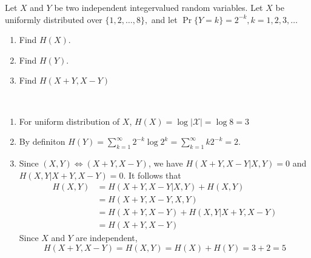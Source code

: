 \begin{exercise}{Let $X$ and $Y$ be two independent integervalued random variables. Let $X$ be uniformly distributed over $\{1,2, \ldots, 8\},$ and let $\operatorname{Pr}\{Y=k\}=2^{-k}, k=1,2,3, \ldots$
  \begin{enumerate}
    \item Find $H(X)$.
    \item Find $H(Y)$.
    \item Find $H(X+Y, X-Y)$
  \end{enumerate}}
  \begin{solution}
    \par{~}
    \begin{enumerate}
      \item {
        For uniform distribution of $X$, $H(X) = \log |\mathcal{X}| = \log 8 = 3$
      }
      \item By definiton $H(Y) = \sum_{k=1}^{\infty} 2^{-k} \log 2^{k} = \sum_{k=1}^{\infty} k 2^{-k} = 2$.
      \item Since $(X,Y) \Leftrightarrow (X+Y,X-Y)$, we have $H(X+Y,X-Y|X,Y)=0$ and $H(X,Y|X+Y,X-Y) =0$. It follows that
      \begin{equation}
        \begin{aligned}
          H(X,Y) &= H(X+Y,X-Y|X,Y) + H(X,Y) \\
          &= H(X+Y,X-Y,X,Y) \\
          &= H(X+Y,X-Y) + H(X,Y|X+Y,X-Y) \\
          &= H(X+Y,X-Y)
        \end{aligned}
      \end{equation}
      Since $X$ and $Y$ are independent,
      $$H(X+Y,X-Y) = H(X,Y) = H(X) +H(Y) = 3 + 2 =5$$
    \end{enumerate}




  \end{solution}
  \label{ex31-4}
\end{exercise}